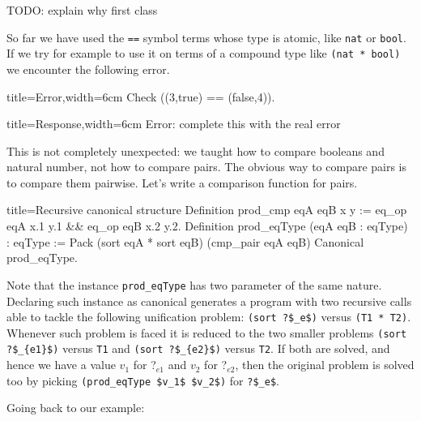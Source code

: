TODO: explain why first class

\label{sec:receqtype}

So far we have used the \lstinline/==/ symbol terms whose type is
atomic, like \lstinline/nat/ or \lstinline/bool/.  If we try for
example to use it on terms of a compound type like
\lstinline/(nat * bool)/ we encounter the following error.

\begin{coq}{title=Error,width=6cm}
Check ((3,true) == (false,4)).
$~$
\end{coq}
\begin{coqout}{title=Response,width=6cm}
Error: complete this
with the real error
\end{coqout}

This is not completely unexpected: we taught \Coq{} how to compare
booleans and natural number, not how to compare pairs.  The obvious
way to compare pairs is to compare them pairwise.  Let's write a
comparison function for pairs. 

\begin{coq}{title=Recursive canonical structure}
Definition prod_cmp eqA eqB x y :=
  eq_op eqA x.1 y.1 && eq_op eqB x.2 y.2.
Definition prod_eqType (eqA eqB : eqType) : eqType :=
  Pack (sort eqA * sort eqB) (cmp_pair eqA eqB)
Canonical prod_eqType.
\end{coq}

Note that the instance \lstinline/prod_eqType/ has two parameter
of the same nature.  Declaring such instance as canonical generates
a program with two recursive calls able to tackle the following
unification problem: \lstinline/(sort ?$_e$)/ versus
\lstinline/(T1 * T2)/.
Whenever such problem is faced it is reduced to the two smaller
problems \lstinline/(sort ?$_{e1}$)/ versus \lstinline/T1/ and
\lstinline/(sort ?$_{e2}$)/ versus \lstinline/T2/.  If both are solved,
and hence we have a value $v_1$ for ?$_{e1}$ and
$v_2$ for ?$_{e2}$, then the original problem is solved too
by picking \lstinline/(prod_eqType $v_1$ $v_2$)/ for
\lstinline/?$_e$/.

Going back to our example:


